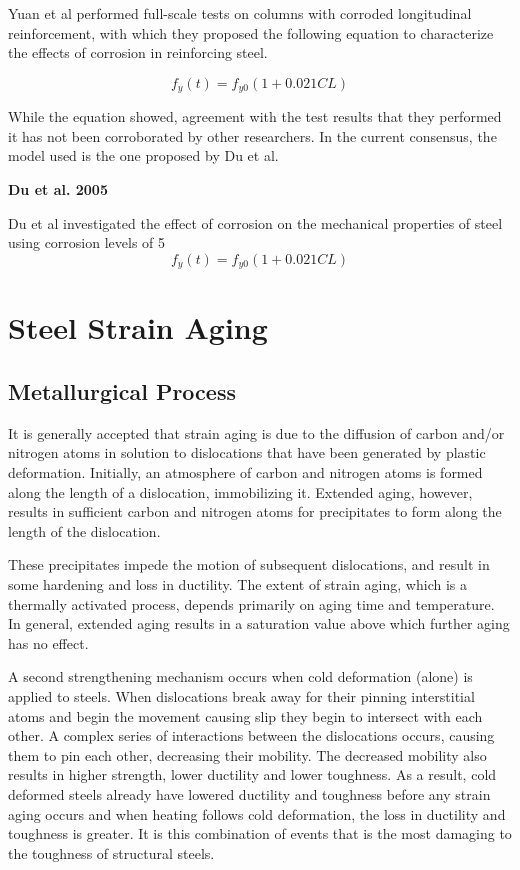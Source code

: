 Yuan et al performed full-scale tests on columns with corroded longitudinal reinforcement, with which they proposed the following equation to characterize the effects of corrosion in reinforcing steel.

\begin{equation}
	f_{y}(t)=f_{y0}(1+0.021CL)
\end{equation}

While the equation showed, agreement with the test results that they performed it has not been corroborated by other researchers. In the current consensus, the model used is the one proposed by Du et al.


\textbf{Du et al. 2005}

Du et al investigated the effect of corrosion on the mechanical properties of steel using corrosion levels of 5%
\begin{equation}
	f_{y}(t)=f_{y0}(1+0.021CL)
\end{equation}

\section{Steel Strain Aging}

\subsection{Metallurgical Process}

It is generally accepted that strain aging is due to the diffusion of carbon and/or nitrogen atoms in solution to dislocations that have been generated by plastic deformation. Initially, an atmosphere of carbon and nitrogen atoms is formed along the length of a dislocation, immobilizing it. Extended aging, however, results in sufficient carbon and nitrogen atoms for precipitates to form along the length of the dislocation.

These precipitates impede the motion of subsequent dislocations, and result in some hardening and loss in ductility. The extent of strain aging, which is a thermally activated process, depends primarily on aging time and temperature. In general, extended aging results in a saturation value above which further aging has no effect.

A second strengthening mechanism occurs when cold deformation (alone) is applied to steels. When dislocations break away for their pinning interstitial atoms and begin the movement causing slip they begin to intersect with each other. A complex series of interactions between the dislocations occurs, causing them to pin each other, decreasing their mobility. The decreased mobility also results in higher strength, lower ductility and lower toughness. As a result, cold deformed steels already have lowered ductility and toughness before any strain aging occurs and when heating follows cold deformation, the loss in ductility and toughness is greater. It is this combination of events that is the most damaging to the toughness of structural steels.

